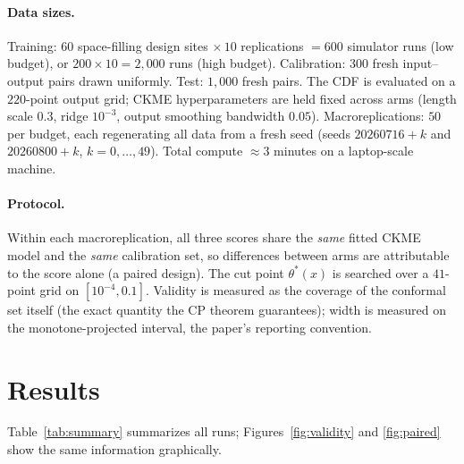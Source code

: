\documentclass[11pt]{article}
\begin{document}
\paragraph{Data sizes.}
Training: $60$ space-filling design sites $\times\, 10$ replications $= 600$
simulator runs (low budget), or $200 \times 10 = 2{,}000$ runs (high budget).
Calibration: $300$ fresh input--output pairs drawn uniformly. Test: $1{,}000$
fresh pairs. The CDF is evaluated on a $220$-point output grid; CKME
hyperparameters are held fixed across arms (length scale $0.3$, ridge
$10^{-3}$, output smoothing bandwidth $0.05$). Macroreplications: $50$ per
budget, each regenerating all data from a fresh seed (seeds $20260716{+}k$
and $20260800{+}k$, $k = 0,\dots,49$). Total compute $\approx 3$ minutes on a
laptop-scale machine.

\paragraph{Protocol.}
Within each macroreplication, all three scores share the \emph{same} fitted
CKME model and the \emph{same} calibration set, so differences between arms
are attributable to the score alone (a paired design). The cut point
$\theta^{*}(x)$ is searched over a $41$-point grid on $[10^{-4}, 0.1]$.
Validity is measured as the coverage of the conformal set itself (the exact
quantity the CP theorem guarantees); width is measured on the
monotone-projected interval, the paper's reporting convention.

\section{Results}

Table~\ref{tab:summary} summarizes all runs; Figures~\ref{fig:validity} and
\ref{fig:paired} show the same information graphically.
\end{document}
